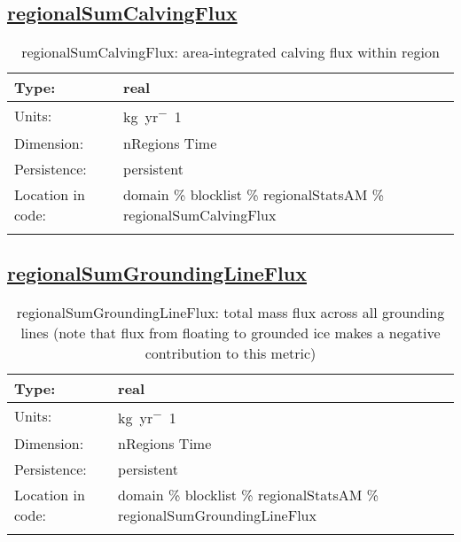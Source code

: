 \subsection[regionalSumCalvingFlux]{\hyperref[sec:var_tab_regionalStatsAM]{regionalSumCalvingFlux}}
\label{subsec:var_sec_regionalStatsAM_regionalSumCalvingFlux}
\begin{center}
\begin{longtable}{| p{2.0in} | p{4.0in} |}
        \hline 
        Type: & real \\
        \hline 
        Units: & \si{kg.yr^-1} \\
        \hline 
        Dimension: & nRegions Time \\
        \hline 
        Persistence: & persistent \\
        \hline 
         Location in code: & domain \% blocklist \% regionalStatsAM \% regionalSumCalvingFlux \\
         \hline 
    \caption{regionalSumCalvingFlux: area-integrated calving flux within region}
\end{longtable}
\end{center}
\subsection[regionalSumGroundingLineFlux]{\hyperref[sec:var_tab_regionalStatsAM]{regionalSumGroundingLineFlux}}
\label{subsec:var_sec_regionalStatsAM_regionalSumGroundingLineFlux}
\begin{center}
\begin{longtable}{| p{2.0in} | p{4.0in} |}
        \hline 
        Type: & real \\
        \hline 
        Units: & \si{kg.yr^-1} \\
        \hline 
        Dimension: & nRegions Time \\
        \hline 
        Persistence: & persistent \\
        \hline 
         Location in code: & domain \% blocklist \% regionalStatsAM \% regionalSumGroundingLineFlux \\
         \hline 
    \caption{regionalSumGroundingLineFlux: total mass flux across all grounding lines (note that flux from floating to grounded ice makes a negative contribution to this metric)}
\end{longtable}
\end{center}
